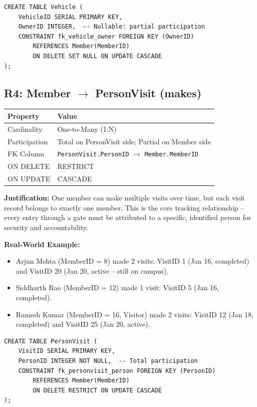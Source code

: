 \documentclass[a4paper, 12pt]{article}
\begin{document}
\begin{lstlisting}[style=sqlstyle, caption={R3 Implementation}, label={lst:r3}]
CREATE TABLE Vehicle (
    VehicleID SERIAL PRIMARY KEY,
    OwnerID INTEGER,  -- Nullable: partial participation
    CONSTRAINT fk_vehicle_owner FOREIGN KEY (OwnerID)
        REFERENCES Member(MemberID)
        ON DELETE SET NULL ON UPDATE CASCADE
);
\end{lstlisting}

\subsection{R4: Member \texorpdfstring{$\rightarrow$}{->} PersonVisit (makes)}

\begin{table}[H]
\centering
\small
\begin{tabularx}{\textwidth}{l X}
\toprule
\textbf{Property} & \textbf{Value} \\
\midrule
Cardinality & One-to-Many (1:N) \\
Participation & Total on PersonVisit side; Partial on Member side \\
FK Column & \texttt{PersonVisit.PersonID} $\rightarrow$ \texttt{Member.MemberID} \\
ON DELETE & RESTRICT \\
ON UPDATE & CASCADE \\
\bottomrule
\end{tabularx}
\end{table}

\textbf{Justification:} One member can make multiple visits over time, but each visit record belongs to exactly one member. This is the core tracking relationship -- every entry through a gate must be attributed to a specific, identified person for security and accountability.

\textbf{Real-World Example:}
\begin{itemize}[leftmargin=*, nosep]
    \item Arjun Mehta (MemberID = 8) made 2 visits: VisitID 1 (Jan 16, completed) and VisitID 20 (Jan 20, active -- still on campus).
    \item Siddharth Rao (MemberID = 12) made 1 visit: VisitID 5 (Jan 16, completed).
    \item Ramesh Kumar (MemberID = 16, Visitor) made 2 visits: VisitID 12 (Jan 18, completed) and VisitID 25 (Jan 20, active).
\end{itemize}

\begin{lstlisting}[style=sqlstyle, caption={R4 Implementation}, label={lst:r4}]
CREATE TABLE PersonVisit (
    VisitID SERIAL PRIMARY KEY,
    PersonID INTEGER NOT NULL,  -- Total participation
    CONSTRAINT fk_personvisit_person FOREIGN KEY (PersonID)
        REFERENCES Member(MemberID)
        ON DELETE RESTRICT ON UPDATE CASCADE
);
\end{lstlisting}
\end{document}
